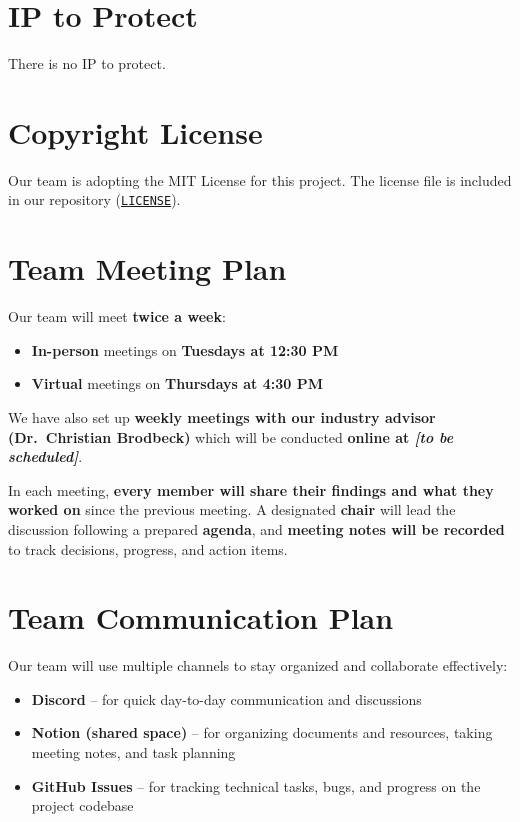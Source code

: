 \documentclass{article}
\begin{document}
\section{IP to Protect}



There is no IP to protect.

\section{Copyright License}

Our team is adopting the MIT License for this project. The license file is included in our repository 
(\href{https://github.com/<your-username>/VoiceBridge/blob/main/LICENSE}{\texttt{LICENSE}}).

\section{Team Meeting Plan}

Our team will meet \textbf{twice a week}:

\begin{itemize}
    \item \textbf{In-person} meetings on \textbf{Tuesdays at 12:30 PM}
    \item \textbf{Virtual} meetings on \textbf{Thursdays at 4:30 PM}
\end{itemize}

We have also set up \textbf{weekly meetings with our industry advisor (Dr.~Christian Brodbeck)} which will be conducted \textbf{online at \textit{[to be scheduled]}}.

In each meeting, \textbf{every member will share their findings and what they worked on} since the previous meeting. A designated \textbf{chair} will lead the discussion following a prepared \textbf{agenda}, and \textbf{meeting notes will be recorded} to track decisions, progress, and action items.

\section{Team Communication Plan}

Our team will use multiple channels to stay organized and collaborate effectively:

\begin{itemize}
    \item \textbf{Discord} – for quick day-to-day communication and discussions
    \item \textbf{Notion (shared space)} – for organizing documents and resources, taking meeting notes, and task planning
    \item \textbf{GitHub Issues} – for tracking technical tasks, bugs, and progress on the project codebase
\end{itemize}
\end{document}
